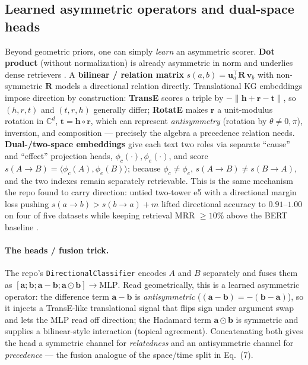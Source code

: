 \subsection{Learned asymmetric operators and dual-space heads}
Beyond geometric priors, one can simply \emph{learn} an asymmetric scorer.
\textbf{Dot product} (without normalization) is already asymmetric in norm and
underlies dense retrievers \citep{geo:karpukhin2020dpr}. A \textbf{bilinear /
relation matrix} $s(a,b)=\mathbf{u}_a^\top \mathbf{R}\,\mathbf{v}_b$ with
non-symmetric $\mathbf{R}$ models a directional relation directly.
Translational KG embeddings impose direction by construction: \textbf{TransE}
\citep{geo:bordes2013transe} scores a triple by $-\lVert \mathbf{h}+\mathbf{r}
-\mathbf{t}\rVert$, so $(h,r,t)$ and $(t,r,h)$ generally differ; \textbf{RotatE}
\citep{geo:sun2019rotate} makes $\mathbf{r}$ a unit-modulus rotation in
$\mathbb{C}^d$, $\mathbf{t}=\mathbf{h}\circ\mathbf{r}$, which can represent
\emph{antisymmetry} (rotation by $\theta\neq0,\pi$), inversion, and composition
--- precisely the algebra a precedence relation needs. \textbf{Dual-/two-space
embeddings} give each text two roles via separate ``cause'' and ``effect''
projection heads, $\phi_c(\cdot),\phi_e(\cdot)$, and score
$s(A\!\to\!B)=\langle \phi_c(A),\phi_e(B)\rangle$; because $\phi_c\neq\phi_e$,
$s(A\!\to\!B)\neq s(B\!\to\!A)$, and the two indexes remain separately
retrievable. This is the same mechanism the repo found to carry direction:
untied two-tower e5 with a directional margin loss pushing
$s(a\!\to\!b)>s(b\!\to\!a)+m$ lifted directional accuracy to $0.91$--$1.00$ on
four of five datasets while keeping retrieval MRR $\geq10\%$ above the BERT
baseline \citep{geo:repo_lorentz2026}.

\paragraph{The heads / fusion trick.}
The repo's \texttt{DirectionalClassifier} encodes $A$ and $B$ separately and
fuses them as $[\mathbf{a};\mathbf{b};\mathbf{a}-\mathbf{b};\mathbf{a}\odot
\mathbf{b}]\!\to\!\mathrm{MLP}$. Read geometrically, this is a learned
asymmetric operator: the difference term $\mathbf{a}-\mathbf{b}$ is
\emph{antisymmetric} ($(\mathbf{a}-\mathbf{b})=-(\mathbf{b}-\mathbf{a})$), so it
injects a TransE-like translational signal that flips sign under argument swap
and lets the MLP read off direction; the Hadamard term $\mathbf{a}\odot
\mathbf{b}$ is symmetric and supplies a bilinear-style interaction (topical
agreement). Concatenating both gives the head a symmetric channel for
\emph{relatedness} and an antisymmetric channel for \emph{precedence} --- the
fusion analogue of the space/time split in Eq.~(7).

